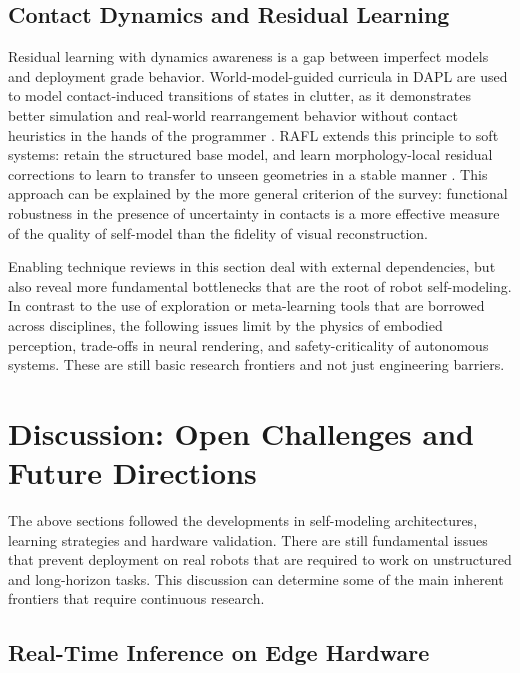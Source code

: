 \documentclass[11pt,a4paper]{article}
\begin{document}
\subsection{Contact Dynamics and Residual Learning}

Residual learning with dynamics awareness is a gap between imperfect models and deployment grade behavior. World-model-guided curricula in DAPL are used to model contact-induced transitions of states in clutter, as it demonstrates better simulation and real-world rearrangement behavior without contact heuristics in the hands of the programmer \cite{zheng2025dapl}. RAFL extends this principle to soft systems: retain the structured base model, and learn morphology-local residual corrections to learn to transfer to unseen geometries in a stable manner \cite{cho2025rafl}. This approach can be explained by the more general criterion of the survey: functional robustness in the presence of uncertainty in contacts is a more effective measure of the quality of self-model than the fidelity of visual reconstruction.


Enabling technique reviews in this section deal with external dependencies, but also reveal more fundamental bottlenecks that are the root of robot self-modeling. In contrast to the use of exploration or meta-learning tools that are borrowed across disciplines, the following issues limit by the physics of embodied perception, trade-offs in neural rendering, and safety-criticality of autonomous systems. These are still basic research frontiers and not just engineering barriers.

\section{Discussion: Open Challenges and Future Directions}
\label{sec:discussion}

The above sections followed the developments in self-modeling architectures, learning strategies and hardware validation. There are still fundamental issues that prevent deployment on real robots that are required to work on unstructured and long-horizon tasks. This discussion can determine some of the main inherent frontiers that require continuous research.

\subsection{Real-Time Inference on Edge Hardware}
\end{document}

